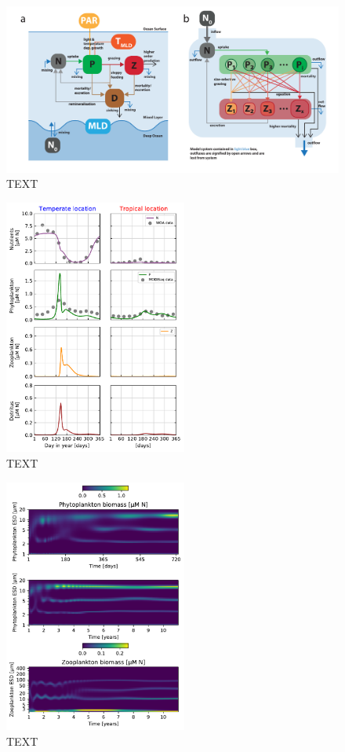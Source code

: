 \documentclass[journal abbreviation, manuscript]{copernicus}
\begin{document}
\begin{figure}[t]
\includegraphics[width=15cm]{Figures/firstdraft_schematics/02__schematics_NPZDandChemostat.pdf}
\caption{TEXT}
\label{phydraschematics_1}
\end{figure}


\begin{figure}[t]
\includegraphics[width=6cm]{Figures/firstdraft_plots/02_NPZDslab.pdf}
\caption{TEXT}
\end{figure}

\begin{figure}[t]
\includegraphics[width=6cm]{Figures/firstdraft_plots/03_chemostat.pdf}
\caption{TEXT}
\label{ASTroCAT_plot}
\end{figure}
\end{document}
